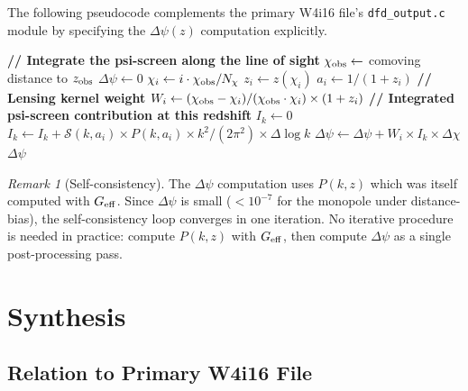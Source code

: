 \documentclass[11pt]{article}
\theoremstyle{definition}
\theoremstyle{remark}
\newtheorem{remark}[theorem]{Remark}
\begin{document}
The following pseudocode complements the primary W4i16 file's
\texttt{dfd\_output.c} module by specifying the $\Delta\psi(z)$
computation explicitly.

\begin{algorithm}[H]
\caption{$\Delta\psi(z)$ Monopole from Matter Power Spectrum}
\label{alg:dpsi}
\begin{algorithmic}[1]
  \Statex \textbf{// Integrate the psi-screen along the line of sight}
  \State $\chi_{\rm obs} \gets$ comoving distance to $z_{\rm obs}$
  \State $\Delta\psi \gets 0$
   
    \State $\chi_i \gets i \cdot \chi_{\rm obs} / N_\chi$
    \State $z_i \gets z(\chi_i)$ 
    \State $a_i \gets 1/(1+z_i)$
    \Statex
    \Statex \textbf{// Lensing kernel weight}
    \State $W_i \gets (\chi_{\rm obs} - \chi_i) / (\chi_{\rm obs} \cdot \chi_i)
      \times (1+z_i)$
    \Statex
    \Statex \textbf{// Integrated psi-screen contribution at this redshift}
    \State $I_k \gets 0$
      \State $I_k \gets I_k + \mathcal{S}(k, a_i) \times P(k, a_i)
        \times k^2 / (2\pi^2) \times \Delta\log k$
    \EndFor
    \Statex
    \State $\Delta\psi \gets \Delta\psi + W_i \times I_k \times \Delta\chi$
  \EndFor
  \State \Return $\Delta\psi$
\EndFunction
\end{algorithmic}
\end{algorithm}

\begin{remark}[Self-consistency]
The $\Delta\psi$ computation uses $P(k,z)$ which was itself computed
with $G_{\rm eff}$. Since $\Delta\psi$ is small ($< 10^{-7}$ for the
monopole under distance-bias), the self-consistency loop converges in
one iteration. No iterative procedure is needed in practice: compute
$P(k,z)$ with $G_{\rm eff}$, then compute $\Delta\psi$ as a single
post-processing pass.
\end{remark}

\section{Synthesis}
\label{sec:synthesis}

\subsection{Relation to Primary W4i16 File}
\end{document}

